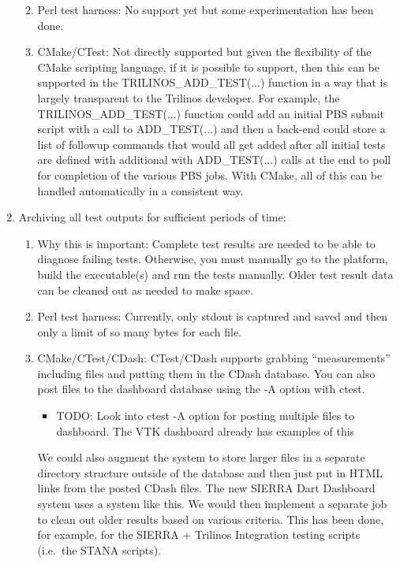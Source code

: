 \documentclass[pdf,ps2pdf,11pt]{SANDreport}
\begin{document}
\begin{enumerate}
\begin{enumerate}
  {}\item Perl test harness: No support yet but some experimentation
  has been done.

  {}\item CMake/CTest: Not directly supported but given the
  flexibility of the CMake scripting language, if it is possible to
  support, then this can be supported in the TRILINOS\_ADD\_TEST(...) 
  function in a way that is largely transparent to the Trilinos
  developer.  For example, the TRILINOS\_ADD\_TEST(...) function could
  add an initial PBS submit script with a call to ADD\_TEST(...) and
  then a back-end could store a list of followup commands that would
  all get added after all initial tests are defined with additional
  with ADD\_TEST(...) calls at the end to poll for completion of the
  various PBS jobs.  With CMake, all of this can be handled
  automatically in a consistent way.

  \end{enumerate}

{}\item Archiving all test outputs for sufficient periods of time:

  \begin{enumerate}

  {}\item Why this is important: Complete test results are needed to
  be able to diagnose failing tests.  Otherwise, you must manually go
  to the platform, build the executable(s) and run the tests manually.
  Older test result data can be cleaned out as needed to make space.

  {}\item Perl test harness: Currently, only stdout is captured and
  saved and then only a limit of so many bytes for each file.

  {}\item CMake/CTest/CDash: CTest/CDash supports grabbing
  ``measurements'' including files and putting them in the CDash
  database.  You can also post files to the dashboard database using
  the -A option with ctest.

    \begin{itemize}

    {}\item TODO: Look into ctest -A option for posting multiple files
    to dashboard.  The VTK dashboard already has examples of this

    \end{itemize}

  We could also augment the system to store larger files in a separate
  directory structure outside of the database and then just put in
  HTML links from the posted CDash files.  The new SIERRA Dart
  Dashboard system uses a system like this.  We would then implement a
  separate job to clean out older results based on various criteria.
  This has been done, for example, for the SIERRA + Trilinos
  Integration testing scripts (i.e.\ the STANA scripts).


\end{enumerate}
\end{enumerate}
\end{document}
